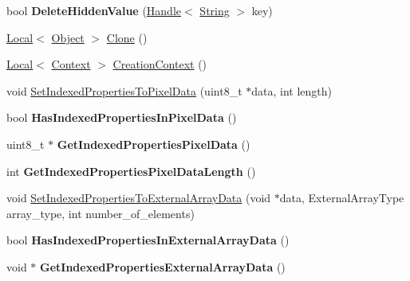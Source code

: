 \begin{DoxyCompactItemize}
\item 
\hypertarget{classv8_1_1Object_ab1d274da1949b1f68087728760ee4172}{}bool {\bfseries Delete\+Hidden\+Value} (\hyperlink{classv8_1_1Handle}{Handle}$<$ \hyperlink{classv8_1_1String}{String} $>$ key)\label{classv8_1_1Object_ab1d274da1949b1f68087728760ee4172}

\item 
\hyperlink{classv8_1_1Local}{Local}$<$ \hyperlink{classv8_1_1Object}{Object} $>$ \hyperlink{classv8_1_1Object_a5018c9d085aa71f65530cf1e073a04ad}{Clone} ()
\item 
\hyperlink{classv8_1_1Local}{Local}$<$ \hyperlink{classv8_1_1Context}{Context} $>$ \hyperlink{classv8_1_1Object_af6966283a7d7e20779961eed434db04d}{Creation\+Context} ()
\item 
void \hyperlink{classv8_1_1Object_a6c552c4817b9a0eff1fb12b7ef089026}{Set\+Indexed\+Properties\+To\+Pixel\+Data} (uint8\+\_\+t $\ast$data, int length)
\item 
\hypertarget{classv8_1_1Object_a984cb47ed59b73d3d1b32f393a653cd4}{}bool {\bfseries Has\+Indexed\+Properties\+In\+Pixel\+Data} ()\label{classv8_1_1Object_a984cb47ed59b73d3d1b32f393a653cd4}

\item 
\hypertarget{classv8_1_1Object_af2cefd0bcc50b19bb23b93b493ceb3d2}{}uint8\+\_\+t $\ast$ {\bfseries Get\+Indexed\+Properties\+Pixel\+Data} ()\label{classv8_1_1Object_af2cefd0bcc50b19bb23b93b493ceb3d2}

\item 
\hypertarget{classv8_1_1Object_ac6af430db5a41a0c9b6cacb507d95e0d}{}int {\bfseries Get\+Indexed\+Properties\+Pixel\+Data\+Length} ()\label{classv8_1_1Object_ac6af430db5a41a0c9b6cacb507d95e0d}

\item 
void \hyperlink{classv8_1_1Object_a530f661dec20ce1a0a1b15a45195418c}{Set\+Indexed\+Properties\+To\+External\+Array\+Data} (void $\ast$data, External\+Array\+Type array\+\_\+type, int number\+\_\+of\+\_\+elements)
\item 
\hypertarget{classv8_1_1Object_ae3c884315aaba6d11d3663a8569fe8f1}{}bool {\bfseries Has\+Indexed\+Properties\+In\+External\+Array\+Data} ()\label{classv8_1_1Object_ae3c884315aaba6d11d3663a8569fe8f1}

\item 
\hypertarget{classv8_1_1Object_a7763a639b0ec6d35f645d0d2facfd8ce}{}void $\ast$ {\bfseries Get\+Indexed\+Properties\+External\+Array\+Data} ()\label{classv8_1_1Object_a7763a639b0ec6d35f645d0d2facfd8ce}


\end{DoxyCompactItemize}
